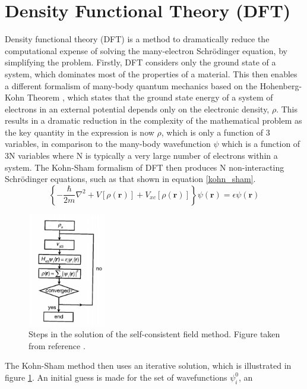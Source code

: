 \section*{Density Functional Theory (DFT)}\label{DFT_section}
Density functional theory (DFT) is a method to dramatically reduce the computational expense of solving the many-electron Schr{\"o}dinger equation, by simplifying the problem. Firstly, DFT considers only the ground state of a system, which dominates most of the properties of a material. This then enables a different formalism of many-body quantum mechanics based on the Hohenberg-Kohn Theorem \cite{hohenberg_kohn}, which states that the ground state energy of a system of electrons in an external potential depends only on the electronic density, $\rho$. 
This results in a dramatic reduction in the complexity of the mathematical problem as the key quantity in the expression is now $\rho$, which is only a function of 3 variables, in comparison to the many-body wavefunction $\psi$ which is a function of 3N variables where N is typically a very large number of electrons within a system. The Kohn-Sham formalism of DFT then produces N non-interacting Schr{\"o}dinger equations, such as that shown in equation \ref{kohn_sham}. 
\begin{equation} \label{kohn_sham}
\left\{ - \frac{\hbar}{2m} \nabla^2 + V[\rho(\mathbf{r})] + V_{xc}[\rho(\mathbf{r})] \right\}\psi(\mathbf{r}) = \epsilon\psi(\mathbf{r})
\end{equation}
\begin{figure}[h!]
  \centering
    \includegraphics[width=0.3\textwidth]{figures/solving_SE.png}
    \caption{Steps in the solution of the self-consistent field method. Figure taken from reference .}
  \label{solving_SE}
\end{figure}
The Kohn-Sham method then uses an iterative solution, which is illustrated in figure 
\ref{solving_SE}. An initial guess is made for the set of wavefunctions $\psi_i^0$, an 
